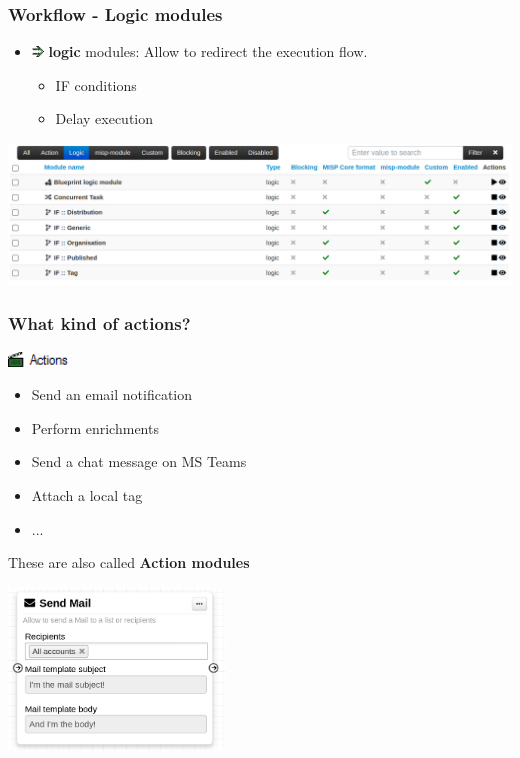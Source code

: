 \begin{frame}
    \frametitle{Workflow - Logic modules}
    \begin{itemize}
        \item \includegraphics[width=12px]{pictures/sc-condition-icon.png} \textbf{logic} modules: Allow to redirect the execution flow.
        \begin{itemize}
            \item IF conditions
            \item Delay execution
        \end{itemize}
    \end{itemize}
    \begin{center}
        \includegraphics[width=1.0\linewidth]{pictures/logic-module-index.png}
    \end{center}
\end{frame}

\begin{frame}
    \frametitle{What kind of actions?}
    \vspace*{0.25em}
    \includegraphics[width=60px]{pictures/sc-action.png}
    \vspace*{0.25em}
    \begin{itemize}
        \item Send an email notification
        \item Perform enrichments
        \item Send a chat message on MS Teams
        \item Attach a local tag
        \item ...
    \end{itemize}

    \vspace*{0.5em}
    {\Large {}} These are also called \textbf{Action modules}
    \begin{center}
        \includegraphics[width=0.43\textwidth]{pictures/action-module.png}
    \end{center}
\end{frame}

